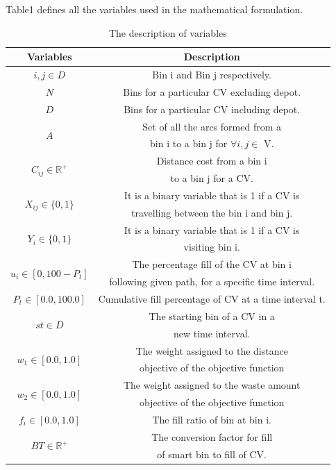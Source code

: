 \documentclass[12pt]{article}
\begin{document}
Table1 defines all the variables used in the mathematical formulation.
\begin{table}[H]\label{variables}
	\centering
	\caption{The description of variables}
	\begin{tabular*}{486pt}[H]{|c|c|}
		\hline \hspace{40pt} Variables \hspace{40pt} & \hspace{130pt} Description \hspace{130pt} \\
		\hline $i, j \in D$ & Bin i and Bin j respectively.\\
		\hline $N$ & Bins for a particular CV excluding depot.\\
		\hline $D$ & Bins for a particular CV including depot.\\
		\hline \multirow{2}{*}{$A$} & Set of all the arcs formed from a\\
		&  bin i to a bin j for $\forall i,j \in$ V.\\
		\hline \multirow{2}{*}{$C_{ij}\in \mathbb{R}^+$} & Distance cost from a bin i\\
		& to a bin j for a CV.\\
		\hline \multirow{2}{*}{$X_{ij} \in \{0, 1\}$} & It is a binary variable that is 1 if a CV is\\
		& travelling between the bin i and bin j.\\  
		\hline \multirow{2}{*}{$Y_{i} \in \{0, 1\}$} & It is a binary variable that is 1 if a CV is \\
		& visiting bin i.\\
		\hline \multirow{2}{*}{$u_{i}  \in [0, 100 -P_{t}] $} & The percentage fill of the CV at bin i \\
		& following given path, for a specific time interval.\\
		\hline \multirow{1}{*}{$P_{t} \in [0.0, 100.0]$} & Cumulative fill percentage of CV at a time interval t.\\
		\hline \multirow{2}{*}{$st \in D$} & The starting bin of a CV in a\\
		& new time interval.\\
		\hline \multirow{2}{*}{$w_{1} \in [0.0, 1.0]$} & The weight assigned to the distance \\
		& objective of the objective function\\
		\hline \multirow{2}{*}{$w_{2} \in [0.0, 1.0]$} & The weight assigned to the waste amount \\
		& objective of the objective function\\
		\hline \multirow{1}{*}{$f_{i} \in [0.0, 1.0]$} & The fill ratio of bin at bin i.\\
		\hline \multirow{2}{*}{$BT \in \mathbb{R}^+$} & The conversion factor for fill \\
		& of smart bin to fill of CV.\\
		
		\hline
	\end{tabular*}
\end{table} 
\end{document}
